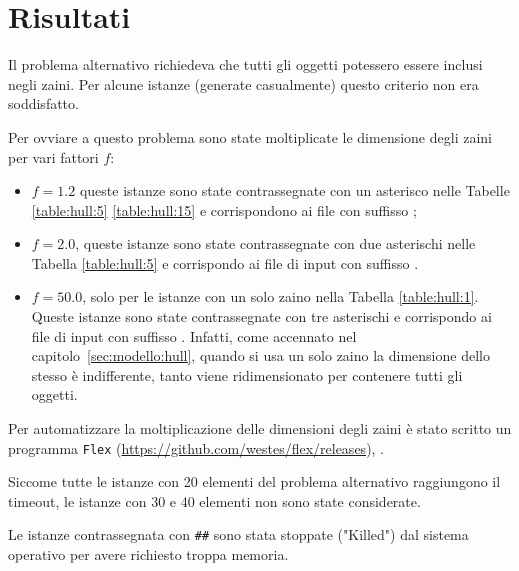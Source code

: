 \section{Risultati}
\label{sec:results}
Il problema alternativo richiedeva che tutti gli oggetti potessero
essere inclusi negli zaini. Per alcune istanze (generate casualmente) 
questo criterio non era soddisfatto.

Per ovviare a questo problema sono state moltiplicate le dimensione degli
zaini per vari fattori $f$:
\begin{itemize}
\item $f = 1.2$ queste istanze sono state contrassegnate con un asterisco nelle
Tabelle \ref{table:hull:5} \ref{table:hull:15} e corrispondono
ai file con suffisso ;
\item $f = 2.0$, queste istanze sono state contrassegnate con due asterischi
nelle Tabella \ref{table:hull:5} 
e corrispondo ai file di input con suffisso .
\item $f = 50.0$, solo per le istanze con un solo
zaino nella Tabella \ref{table:hull:1}. Queste istanze sono state contrassegnate
 con tre asterischi e corrispondo ai file di input con suffisso
. 
Infatti,
come accennato nel capitolo~\ref{sec:modello:hull}, quando si usa un solo zaino
la dimensione dello stesso è indifferente, tanto viene ridimensionato
per contenere tutti gli oggetti.

\end{itemize}


Per automatizzare la moltiplicazione delle dimensioni degli zaini è stato 
scritto un programma \verb|Flex| (\url{https://github.com/westes/flex/releases}),
.

Siccome tutte le istanze con 20 elementi del problema alternativo raggiungono
il timeout, le istanze con 30 e 40 elementi non sono state considerate.

Le istanze contrassegnata con \texttt{\#\#} sono stata stoppate ("Killed") 
dal sistema operativo per avere richiesto troppa memoria.



